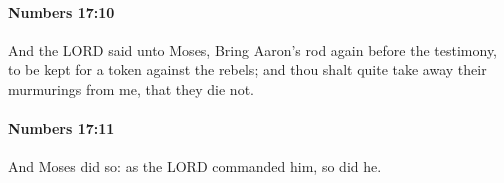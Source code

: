 		\paragraph{Numbers 17:10} %
			\label{NUMBERS-17-10}

			And the LORD said unto Moses, Bring Aaron’s rod again before the testimony, to be kept for a token against the rebels; and thou shalt quite take away their murmurings from me, that they die not.


		\paragraph{Numbers 17:11} %
			\label{NUMBERS-17-11}

			And Moses did so: as the LORD commanded him, so did he.



